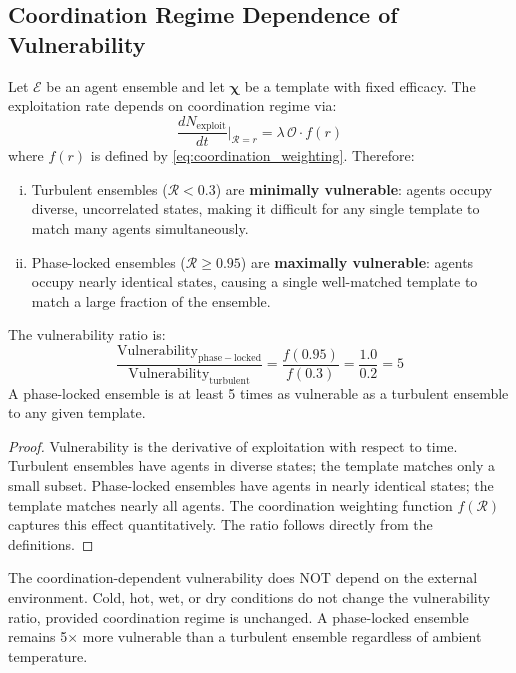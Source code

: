 \documentclass[11pt,twocolumn,a4paper]{article}
\newcommand{\Template}{\boldsymbol{\chi}}
\newcommand{\Coord}{\mathcal{R}}
\newcommand{\Overlap}{\mathcal{O}}
\begin{document}
\subsection{Coordination Regime Dependence of Vulnerability}

\begin{theorem}
\label{thm:coord_vuln}
Let $\mathcal{E}$ be an agent ensemble and let $\Template$ be a template with fixed efficacy. The exploitation rate depends on coordination regime via:
\begin{equation}
\frac{dN_{\mathrm{exploit}}}{dt}\bigg|_{\Coord=r} = \lambda \, \Overlap \cdot f(r)
\label{eq:coord_depend}
\end{equation}
where $f(r)$ is defined by \cref{eq:coordination_weighting}. Therefore:
\begin{enumerate}[(i)]
\item Turbulent ensembles ($\Coord < 0.3$) are \textbf{minimally vulnerable}: agents occupy diverse, uncorrelated states, making it difficult for any single template to match many agents simultaneously.
\item Phase-locked ensembles ($\Coord \ge 0.95$) are \textbf{maximally vulnerable}: agents occupy nearly identical states, causing a single well-matched template to match a large fraction of the ensemble.
\end{enumerate}
The vulnerability ratio is:
\begin{equation}
\frac{\text{Vulnerability}_{\mathrm{phase-locked}}}{\text{Vulnerability}_{\mathrm{turbulent}}} = \frac{f(0.95)}{f(0.3)} = \frac{1.0}{0.2} = 5
\label{eq:vuln_ratio}
\end{equation}
A phase-locked ensemble is at least 5 times as vulnerable as a turbulent ensemble to any given template.
\end{theorem}

\begin{proof}
Vulnerability is the derivative of exploitation with respect to time. Turbulent ensembles have agents in diverse states; the template matches only a small subset. Phase-locked ensembles have agents in nearly identical states; the template matches nearly all agents. The coordination weighting function $f(\Coord)$ captures this effect quantitatively. The ratio follows directly from the definitions.
\end{proof}

\begin{remark}
The coordination-dependent vulnerability does NOT depend on the external environment. Cold, hot, wet, or dry conditions do not change the vulnerability ratio, provided coordination regime is unchanged. A phase-locked ensemble remains 5× more vulnerable than a turbulent ensemble regardless of ambient temperature.
\end{remark}
\end{document}
